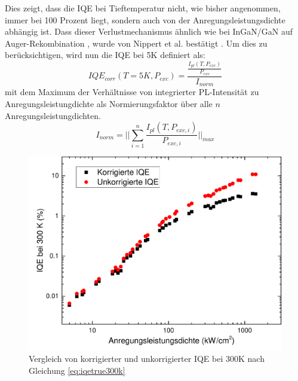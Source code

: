 \vspace{0.1cm}
\noindent
\newline
Dies zeigt, dass die IQE bei Tieftemperatur nicht, wie bisher angenommen, immer bei 100 Prozent liegt, sondern auch von der  Anregungsleistungsdichte abhängig ist. Dass dieser Verlustmechanismus ähnlich wie bei InGaN/GaN auf Auger-Rekombination , wurde von Nippert et al. bestätigt \cite{doi:10.1063/1.4965298}. 
\newline
Um dies zu berücksichtigen, wird nun die IQE bei 5K definiert als:
\begin{equation}
    IQE_{corr}(T = 5K, P_{exc}) = \frac{ \frac{I_{pl}(T,P_{exc}) }{P_{exc} } } { I_{norm}}
    \label{eq:iqetrue5k}
\end{equation}
mit dem Maximum der Verhältnisse von integrierter PL-Intensität zu Anregungsleistungdichte als  Normierungsfaktor über alle $n$ Anregungsleistungdichten.
\begin{equation}
    I_{norm} = \lvert \lvert \sum_{i=1}^{n} \frac{I_{pl}(T,P_{exc,i})}{P_{exc,i}} \lvert \lvert_{max}
    \label{eq:iplnorm}
\end{equation}
\noindent
\begin{figure}[htb]
\centering
    \begin{minipage}[t]{0.49\linewidth}
        \includegraphics[width=\linewidth]{Bilder/korrigierteIQE300K.pdf}
        \caption{Vergleich von korrigierter und unkorrigierter IQE bei 300K nach Gleichung \ref{eq:iqetrue300k} }
        \label{fig:trueiqe300k}
    \end{minipage}
\end{figure}
